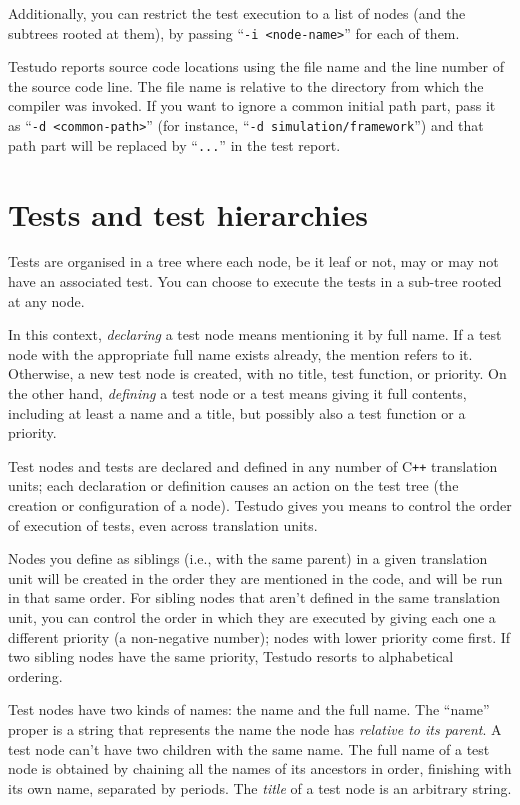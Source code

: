 \documentclass[twoside, a4paper, article]{memoir}
\newcommand*\Cpp{C\texttt{++}}
\begin{document}
Additionally, you can restrict the test execution to a list of nodes (and the
subtrees rooted at them), by passing ``\texttt{-i <node-name>}'' for each of
them.

Testudo reports source code locations using the file name and the line number
of the source code line.  The file name is relative to the directory from which
the compiler was invoked.  If you want to ignore a common initial path part,
pass it as ``\texttt{-d <common-path>}'' (for instance, ``\texttt{-d
  simulation/framework}'') and that path part will be replaced by
``\texttt{...}''  in the test report.


\chapter{Tests and test hierarchies}
\label{cha:tests-test-hierarchies}

Tests are organised in a tree where each node, be it leaf or not, may or may
not have an associated test.  You can choose to execute the tests in a sub-tree
rooted at any node.

In this context, \emph{declaring} a test node means mentioning it by full name.
If a test node with the appropriate full name exists already, the mention
refers to it.  Otherwise, a new test node is created, with no title, test
function, or priority.  On the other hand, \emph{defining} a test node or a
test means giving it full contents, including at least a name and a title, but
possibly also a test function or a priority.

Test nodes and tests are declared and defined in any number of \Cpp{}
translation units; each declaration or definition causes an action on the test
tree (the creation or configuration of a node).  Testudo gives you means to
control the order of execution of tests, even across translation units.

Nodes you define as siblings (i.e., with the same parent) in a given
translation unit will be created in the order they are mentioned in the code,
and will be run in that same order.  For sibling nodes that aren't defined in
the same translation unit, you can control the order in which they are executed
by giving each one a different priority (a non-negative number); nodes with
lower priority come first.  If two sibling nodes have the same priority,
Testudo resorts to alphabetical ordering.

Test nodes have two kinds of names: the name and the full name.  The ``name''
proper is a string that represents the name the node has \emph{relative to its
  parent}.  A test node can't have two children with the same name.  The full
name of a test node is obtained by chaining all the names of its ancestors in
order, finishing with its own name, separated by periods.  The \emph{title} of
a test node is an arbitrary string.
\end{document}
